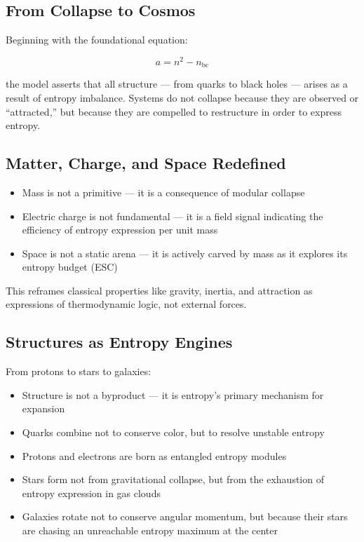 \documentclass[12pt]{article}
\begin{document}
\subsection{From Collapse to Cosmos}

Beginning with the foundational equation:

\[
a = n^2 - n_{\text{bc}}
\]

the model asserts that all structure — from quarks to black holes — arises as a result of entropy imbalance. Systems do not collapse because they are observed or ``attracted,'' but because they are compelled to restructure in order to express entropy.

\subsection{Matter, Charge, and Space Redefined}

\begin{itemize}
    \item Mass is not a primitive — it is a consequence of modular collapse
    \item Electric charge is not fundamental — it is a field signal indicating the efficiency of entropy expression per unit mass
    \item Space is not a static arena — it is actively carved by mass as it explores its entropy budget (ESC)
\end{itemize}

This reframes classical properties like gravity, inertia, and attraction as expressions of thermodynamic logic, not external forces.

\subsection{Structures as Entropy Engines}

From protons to stars to galaxies:
\begin{itemize}
    \item Structure is not a byproduct — it is entropy’s primary mechanism for expansion
    \item Quarks combine not to conserve color, but to resolve unstable entropy
    \item Protons and electrons are born as entangled entropy modules
    \item Stars form not from gravitational collapse, but from the exhaustion of entropy expression in gas clouds
    \item Galaxies rotate not to conserve angular momentum, but because their stars are chasing an unreachable entropy maximum at the center
\end{itemize}
\end{document}
